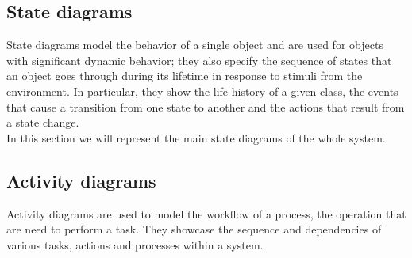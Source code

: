 \subsection{State diagrams}
State diagrams model the behavior of a single object and are used for objects with 
significant dynamic behavior; they also specify the sequence of states that an 
object goes through during its lifetime in response to stimuli from the environment.
In particular, they show the life history of a given class, the events that cause a transition
from one state to another and the actions that result from a state change.\\
In this section we will represent the main state diagrams of the whole system.

\subsection{Activity diagrams}
Activity diagrams are used to model the workflow of a process, the operation that are need to perform a task.
They showcase the sequence and dependencies of various tasks, actions and processes within a system.\\


